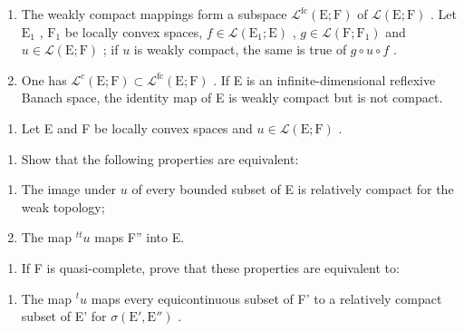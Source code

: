 \begin{enumerate}
\def\labelenumi{\alph{enumi})}
\item
  The weakly compact mappings form a subspace \(\mathcal{L}^{\mathrm{fc}}(\mathrm{E};\mathrm{F})\) of \(\mathcal{L}(\mathrm{E};\mathrm{F})\) . Let \(\mathrm{E}_1\) , \(\mathrm{F}_1\) be locally convex spaces, \(f\in \mathcal{L}(\mathrm{E}_1;\mathrm{E})\) , \(g\in \mathcal{L}(\mathrm{F};\mathrm{F}_1)\) and \(u\in \mathcal{L}(\mathrm{E};\mathrm{F})\) ; if \(u\) is weakly compact, the same is true of \(g\circ u\circ f\) .
\item
  One has \(\mathcal{L}^{c}(\mathrm{E};\mathrm{F})\subset\mathcal{L}^{\mathrm{fc}}(\mathrm{E};\mathrm{F})\) . If E is an infinite-dimensional reflexive Banach space, the identity map of E is weakly compact but is not compact.
\end{enumerate}

\begin{enumerate}
\def\labelenumi{\arabic{enumi})}
\setcounter{enumi}{27}
\tightlist
\item
  Let E and F be locally convex spaces and \(u \in \mathcal{L}(\mathrm{E};\mathrm{F})\) .
\end{enumerate}

\begin{enumerate}
\def\labelenumi{\alph{enumi})}
\tightlist
\item
  Show that the following properties are equivalent:
\end{enumerate}

\begin{enumerate}
\def\labelenumi{(\roman{enumi})}
\item
  The image under \(u\) of every bounded subset of E is relatively compact for the weak topology;
\item
  The map \(^{tt}u\) maps F'' into E.
\end{enumerate}

\begin{enumerate}
\def\labelenumi{\alph{enumi})}
\setcounter{enumi}{1}
\tightlist
\item
  If F is quasi-complete, prove that these properties are equivalent to:
\end{enumerate}

\begin{enumerate}
\def\labelenumi{(\roman{enumi})}
\setcounter{enumi}{2}
\tightlist
\item
  The map \(^{t}u\) maps every equicontinuous subset of F' to a relatively compact subset of E' for \(\sigma(\mathrm{E}',\mathrm{E}'')\) .
\end{enumerate}

